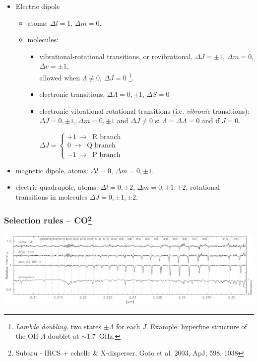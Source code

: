 \begin{frame}
\begin{itemize} 
\item Electric dipole
\begin{itemize} 
\item  atoms: $\Delta l = 1$, $\Delta m = 0$. 
\item  molecules: 
\begin{itemize}  
\item vibrational-rotational transitions, or rovibrational,  $\Delta J
  = \pm 1$, $\Delta m = 0$,$\Delta v = \pm 1$,\\ allowed when $\Lambda \neq
0$, $\Delta J = 0$ \footnote{ {\em Lambda doubling}, two
states $\pm\Lambda$ for each $J$. Example: hyperfine structure of the
OH $\Lambda$ doublet at $\sim$1.7~GHz.}.
\item  electronic transitions, $\Delta \Lambda = 0, \pm 1$, $\Delta S = 0$\\
\item  electronic-vibrational-rotational transitions 
  (i.e. {\em vibronic} transitions): $\Delta J = 0, \pm 1 $, $\Delta m
  = 0, \pm 1$ and $\Delta J \neq 0$ si $\Lambda = \Delta \Lambda = 0$
  and if  $J = 0$.

  \medskip 

$\Delta J  =   \left\{  \begin{array}{l} 
+1~ \rightarrow~  \text{ R branch} \\
0~ \rightarrow~  \text{ Q branch} \\
-1~ \rightarrow~  \text{ P branch}  \end{array} \right. 
$
\end{itemize}
\end{itemize}
\item  magnetic dipole,  atoms: $\Delta l = 0$, $\Delta m = 0, \pm 1$. 
\item  electric quadrupole,  atoms: $\Delta l = 0, \pm 2$,
  $\Delta m = 0, \pm 1, \pm 2$, rotational transitions in molecules
  $\Delta J = 0, \pm 1, \pm 2$.
\end{itemize}



\end{frame} \begin{frame}\frametitle{Selection rules -- CO\footnote{{Subaru - IRCS + echelle
      \& X-disperser, Goto et al. 2003, ApJ, 598, 1038}}}
\vspace{-1cm}

\begin{center}
\includegraphics[width=\textwidth,height=!]{./B/CO_subaru_1.jpg}


\end{center}
\end{frame}
